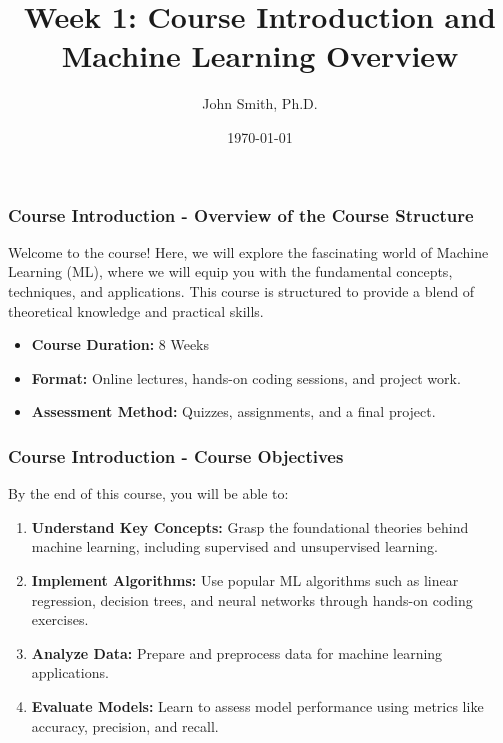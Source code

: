\documentclass[aspectratio=169]{beamer}
\title[Course Introduction]{Week 1: Course Introduction and Machine Learning Overview}
\author[J. Smith]{John Smith, Ph.D.}
\institute[University Name]{
  Department of Computer Science\\
  University Name\\
  \vspace{0.3cm}
  Email: email@university.edu\\
  Website: www.university.edu
}
\date{\today}
\begin{document}
\frame{\titlepage}

\begin{frame}[fragile]
    \frametitle{Course Introduction - Overview of the Course Structure}
    Welcome to the course! Here, we will explore the fascinating world of Machine Learning (ML), where we will equip you with the fundamental concepts, techniques, and applications. This course is structured to provide a blend of theoretical knowledge and practical skills.

    \begin{itemize}
        \item \textbf{Course Duration:} 8 Weeks
        \item \textbf{Format:} Online lectures, hands-on coding sessions, and project work.
        \item \textbf{Assessment Method:} Quizzes, assignments, and a final project.
    \end{itemize}
\end{frame}

\begin{frame}[fragile]
    \frametitle{Course Introduction - Course Objectives}
    By the end of this course, you will be able to:

    \begin{enumerate}
        \item \textbf{Understand Key Concepts:} Grasp the foundational theories behind machine learning, including supervised and unsupervised learning.
        \item \textbf{Implement Algorithms:} Use popular ML algorithms such as linear regression, decision trees, and neural networks through hands-on coding exercises.
        \item \textbf{Analyze Data:} Prepare and preprocess data for machine learning applications.
        \item \textbf{Evaluate Models:} Learn to assess model performance using metrics like accuracy, precision, and recall.
    \end{enumerate}
\end{frame}
\end{document}
